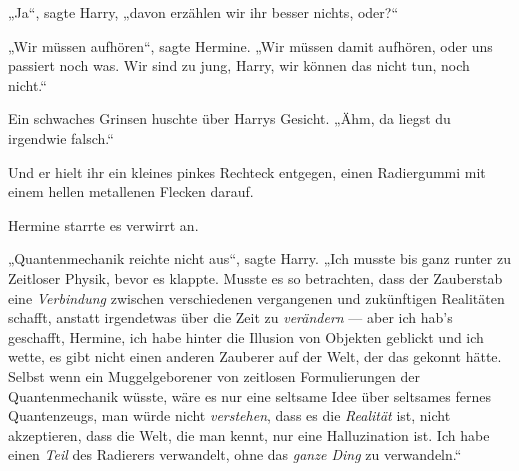 „Ja“, sagte Harry, „davon erzählen wir ihr besser nichts, oder?“

„Wir müssen aufhören“, sagte Hermine.
„Wir müssen damit aufhören, oder uns passiert noch was. Wir sind zu jung, Harry, wir können das nicht tun, noch nicht.“

Ein schwaches Grinsen huschte über Harrys Gesicht. „Ähm, da liegst du irgendwie falsch.“

Und er hielt ihr ein kleines pinkes Rechteck entgegen, einen Radiergummi mit einem hellen metallenen Flecken darauf.

Hermine starrte es verwirrt an.

„Quantenmechanik reichte nicht aus“, sagte Harry.
„Ich musste bis ganz runter zu Zeitloser Physik, bevor es klappte. Musste es so betrachten, dass der Zauberstab eine \emph{Verbindung} zwischen verschiedenen vergangenen und zukünftigen Realitäten schafft, anstatt irgendetwas über die Zeit zu \emph{verändern} — aber ich hab’s geschafft, Hermine, ich habe hinter die Illusion von Objekten geblickt und ich wette, es gibt nicht einen anderen Zauberer auf der Welt, der das gekonnt hätte. Selbst wenn ein Muggelgeborener von zeitlosen Formulierungen der Quantenmechanik wüsste, wäre es nur eine seltsame Idee über seltsames fernes Quantenzeugs, man würde nicht \emph{verstehen}, dass es die \emph{Realität} ist, nicht akzeptieren, dass die Welt, die man kennt, nur eine Halluzination ist. Ich habe einen \emph{Teil} des Radierers verwandelt, ohne das \emph{ganze Ding} zu verwandeln.“

